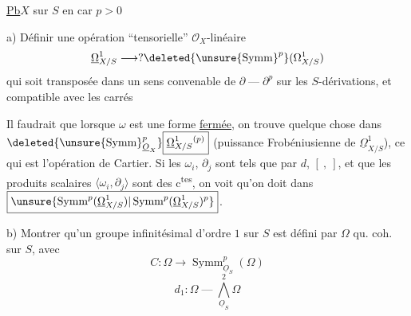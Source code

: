 \uline{Pb}\qquad $X$ sur $S$ en car $p>0$

a) Définir une opération ``tensorielle''
$\mathcal O_X$-linéaire
\[
\underline\Omega^1_{X/S}\longrightarrow
?\deleted{\unsure{\operatorname{Symm}}^p}(\Omega^1_{X/S})
\]
qui soit transposée dans un sens convenable
de \deleted{$\unsure{\partial}$} $\partial\mathbin{\text{---}}\partial^p$
sur les $S$-dérivations, et compatible avec les carrés

Il faudrait que lorsque $\omega$ est une forme \uline{fermée},
on trouve quelque chose dans
$\deleted{\unsure{\operatorname{Symm}}^p_{\underline O_X}}\boxed{\underline\Omega^1_{X/S}{}^{(p)}}$
(puissance Frobéniusienne de $\underline\Omega^1_{X/S}$),
ce qui est l'opération de Cartier.
Si les $\omega_i$, $\partial_j$ sont tels que
 par $d$, $[\ ,\ ]$, et que
les produits scalaires $\langle\omega_i,\partial_j\rangle$ sont des c\textsuperscript{tes},
on voit qu'on doit  dans
$\boxed{\unsure{\operatorname{Symm}^p(\underline\Omega^1_{X/S})|\operatorname{Symm}^p(\underline\Omega^1_{X/S})^p}}$.

b) Montrer qu'un groupe infinitésimal d'ordre $1$ sur $S$
est défini par $\Omega$ qu. coh. sur $S$, avec
\[
C:\Omega\longrightarrow\operatorname{Symm}_{\underline O_S}^p(\Omega)
\]
\[
d_1:\Omega\mathbin{\text{---}}\bigwedge_{\underline O_S}^2\Omega
\]

